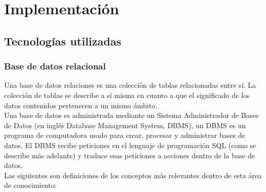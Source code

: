 \chapter{Implementación}\label{cap4}

\section{Tecnologías utilizadas}
\subsection{Base de datos relacional}\label{sec:bd-r}
Una base de datos relaciones es una colección de tablas relacionadas entre sí. La colección de tablas se describe a sí misma en cuanto a que el significado de los datos contenidos pertenecen a un mismo ámbito\cite{DataBaseConcepts}.\\
Una base de datos es administrada mediante un Sistema Administrador de Bases de Datos (en inglés Database Management System, DBMS), un DBMS es un programa de computadora usado para crear, procesar y administrar bases de datos. El DBMS recibe peticiones en el lenguaje de programación SQL (como se describe más adelante) y traduce esas peticiones a acciones dentro de la base de datos\cite{DataBaseConcepts}.\\
Las siguientes son definiciones de los conceptos más relevantes dentro de esta área de conocimiento:
